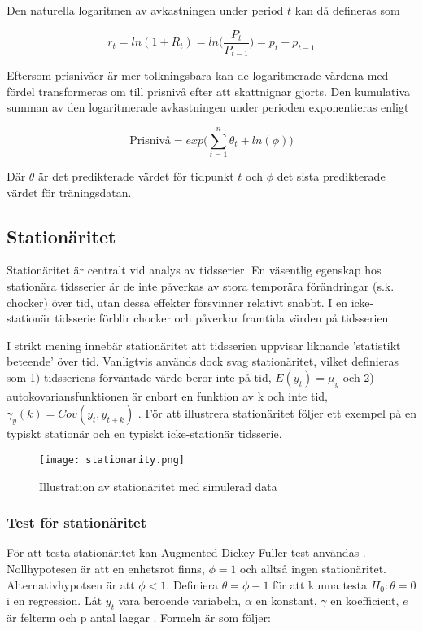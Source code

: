 \documentclass[12pt]{article}
\begin{document}
Den naturella logaritmen av avkastningen under period $t$ kan då defineras som

\begin{equation*}
    r_{t}=ln(1 + R_{t})=ln\Big(\frac{P_{t}}{P_{t-1}}\Big)=p_{t}-p_{t-1}
\end{equation*}

Eftersom prisnivåer är mer tolkningsbara kan de logaritmerade värdena med fördel transformeras om till prisnivå efter att skattnignar gjorts. Den kumulativa summan av den logaritmerade avkastningen under perioden exponentieras enligt

\begin{equation*}
    \text{Prisnivå} =  exp\Big({\sum\limits_{t=1}^n \theta_{t}} + ln(\phi)\Big)
\end{equation*}

Där  $\theta$ är det predikterade värdet för tidpunkt $t$ och $\phi$ det sista predikterade värdet för träningsdatan. 






\subsection{Stationäritet}
Stationäritet är centralt vid analys av tidsserier. En väsentlig egenskap hos stationära tidsserier är de inte påverkas av stora temporära förändringar (s.k. chocker) över tid, utan dessa effekter försvinner relativt snabbt. I en icke-stationär tidsserie förblir chocker och påverkar framtida värden på tidsserien. \par
I strikt mening innebär stationäritet att tidsserien uppvisar liknande 'statistikt beteende' över tid. Vanligtvis används dock svag stationäritet, vilket definieras som 1) tidsseriens förväntade värde beror inte på tid, \(E(y_t)=\mu_y\) och 2) autokovariansfunktionen är enbart en funktion av k och inte tid, \(\gamma_y(k) = Cov(y_t, y_{t+k})\) \parencite{montgomery2015forecasting}. För att illustrera stationäritet följer ett exempel på en typiskt stationär och en typiskt icke-stationär tidsserie.

\begin{figure}[H]
\caption{Illustration av stationäritet med simulerad data}
\texttt{[image: stationarity.png]}
\centering
\end{figure}

\subsubsection{Test för stationäritet}
För att testa stationäritet kan Augmented Dickey-Fuller test användas \parencite{dickey1979distribution}. Nollhypotesen är att en enhetsrot finns, \(\phi=1\) och alltså ingen stationäritet. Alternativhypotsen är att \(\phi<1\). Definiera \(\theta = \phi -1 \) för att kunna testa \(H_0:\theta=0\) i en regression. Låt \(y_t\) vara beroende variabeln, \( \alpha \) en konstant, \( \gamma \) en koefficient, \(e\) är felterm och p antal laggar \parencite{wooldridge2018introductory}. Formeln är som följer:
\end{document}
